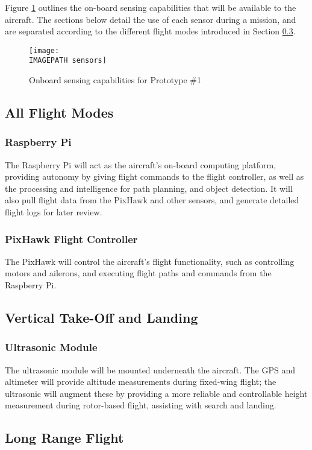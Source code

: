 Figure \ref{fig:sensing} outlines the on-board sensing capabilities that will be available to the aircraft. The sections below detail the use of each sensor during a mission, and are separated according to the different flight modes introduced in Section \ref{}. 

\begin{figure}[!h]
	\centering
	\texttt{[image: \\IMAGEPATH sensors]}
	\caption{Onboard sensing capabilities for Prototype \#1}
	\label{fig:sensing}
\end{figure}

\subsection{All Flight Modes}
\subsubsection*{Raspberry Pi}
The Raspberry Pi will act as the aircraft's on-board computing platform, providing autonomy by giving flight commands to the flight controller, as well as the processing and intelligence for path planning, and object detection. It will also pull flight data from the PixHawk and other sensors, and generate detailed flight logs for later review.

\subsubsection*{PixHawk Flight Controller}
The PixHawk will control the aircraft's flight functionality, such as controlling motors and ailerons, and executing flight paths and commands from the Raspberry Pi.

\subsection{Vertical Take-Off and Landing}
\subsubsection*{Ultrasonic Module}
The ultrasonic module will be mounted underneath the aircraft. The GPS and altimeter will provide altitude measurements during fixed-wing flight; the ultrasonic will augment these by providing a more reliable and controllable height measurement during rotor-based flight, assisting with search and landing.

\subsection{Long Range Flight}
